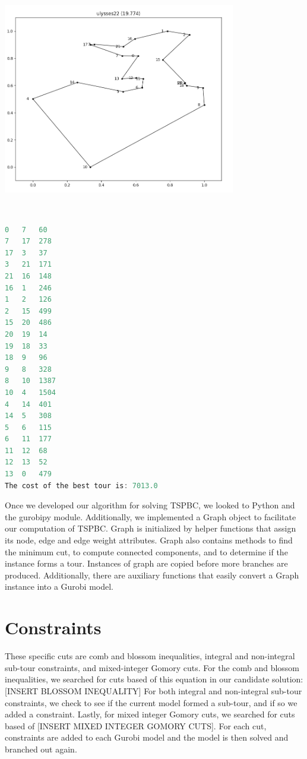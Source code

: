 \documentclass{article}
\begin{document}
\begin{flushleft}
\begin{flushleft}
\includegraphics[width=4in, height=4in]{ulysses_optTour}

\begin{lstlisting}[language=C]
0   7   60
7   17  278
17  3   37
3   21  171
21  16  148
16  1   246
1   2   126
2   15  499
15  20  486
20  19  14
19  18  33
18  9   96
9   8   328
8   10  1387
10  4   1504
4   14  401
14  5   308
5   6   115
6   11  177
11  12  68
12  13  52
13  0   479
The cost of the best tour is: 7013.0
\end{lstlisting}

\end{flushleft}


\end{flushleft}




Once we developed our algorithm for solving TSPBC,
we looked to Python and the gurobipy module.
Additionally, we implemented a Graph object
to facilitate our computation of TSPBC.
Graph is initialized
by helper functions
that assign its node, edge and edge weight attributes.
Graph also contains
methods to find the minimum cut,
to compute connected components,
and to determine if the instance forms a tour.
Instances of graph are copied
before more branches are produced.
Additionally, there are auxiliary functions
that easily convert
a Graph instance into a Gurobi model.


\section{Constraints}
These specific cuts
are comb and blossom inequalities,
integral and non-integral sub-tour constraints,
and mixed-integer Gomory cuts.
For the comb and blossom inequalities,
we searched for cuts based of this equation
in our candidate solution:
[INSERT BLOSSOM INEQUALITY]
For both integral and non-integral sub-tour constraints,
we check to see
if the current model formed a sub-tour,
and if so we added a constraint.
Lastly, for mixed integer Gomory cuts,
we searched for cuts based of
[INSERT MIXED INTEGER GOMORY CUTS].
For each cut,
constraints are added
to each Gurobi model
and the model is then solved
and branched out again.
\end{document}
